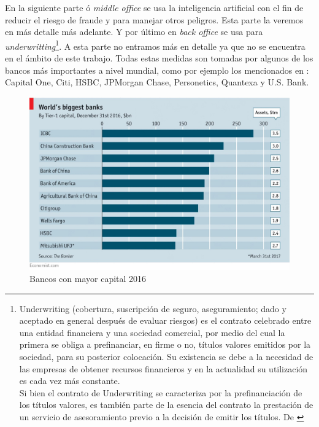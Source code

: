 \documentclass[12pt, a4paper]{report}
\begin{document}
En la siguiente parte ó \textit{middle office} se usa la inteligencia artificial con el fin de reducir el riesgo de fraude y para manejar otros peligros. Esta parte la veremos en más detalle más adelante.
\newline
\newline
Y por último en \textit{back office} se usa para \textit{underwritting}\footnote{Underwriting (cobertura, suscripción de seguro, aseguramiento; dado y aceptado en general después de evaluar riesgos) es el contrato celebrado entre una entidad financiera y una sociedad comercial, por medio del cual la primera se obliga a prefinanciar, en firme o no, títulos valores emitidos por la sociedad, para su posterior colocación. Su existencia se debe a la necesidad de las empresas de obtener recursos financieros y en la actualidad su utilización es cada vez más constante. \\Si bien el contrato de Underwriting se caracteriza por la prefinanciación de los títulos valores, es también parte de la esencia del contrato la prestación de un servicio de asesoramiento previo a la decisión de emitir los títulos. De \cite{wikipedia underwritting}}. A esta parte no entramos más en detalle ya que no se encuentra en el ámbito de este trabajo.
\newline
\newline
Todas estas medidas son tomadas por algunos de los bancos más importantes a nivel mundial, como por ejemplo los mencionados en \cite{url3}:  Capital One, Citi, HSBC, JPMorgan Chase, Personetics, Quantexa y U.S. Bank.

\begin{figure}[H]
	\centering
	\includegraphics[width=\textwidth]{biggest_banks}
	\caption{Bancos con mayor capital 2016}
	\label{banks}
\end{figure}
\end{document}
